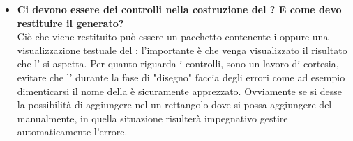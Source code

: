 \begin{itemize}
	   	 		\item
	   	 \textbf{Ci devono essere dei controlli nella costruzione del ? E come devo restituire il  generato? \\}
	   	\justifying
	   	 Ciò che viene restituito può essere un pacchetto contenente i  oppure una visualizzazione testuale del ; l'importante è che venga visualizzato il risultato che l' si aspetta. Per quanto riguarda i controlli, sono un lavoro di cortesia, evitare che l' durante la fase di "disegno" faccia degli errori come ad esempio dimenticarsi il nome della  è sicuramente apprezzato. Ovviamente se si desse la possibilità di aggiungere nel  un rettangolo dove si possa aggiungere del  manualmente, in quella situazione risulterà impegnativo gestire automaticamente l'errore. 
	   	 \end{itemize}
